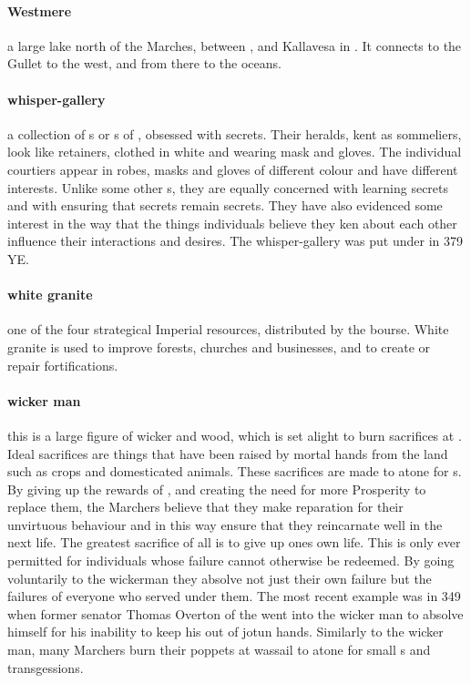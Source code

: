 \paragraph{Westmere} a large lake north of the Marches, between ,  and Kallavesa in . It connects to the Gullet to the west, and from there to the oceans.
\paragraph{whisper-gallery} a collection of s or s of , obsessed with secrets. Their heralds, kent as sommeliers, look like retainers, clothed in white and wearing mask and gloves. The individual courtiers appear in robes, masks and gloves of different colour and have different interests. Unlike some other  s, they are equally concerned with learning secrets and with ensuring that secrets remain secrets. They have also evidenced some interest in the way that the things individuals believe they ken about each other influence their interactions and desires. The whisper-gallery was put under  in 379 YE.
\paragraph{white granite} one of the four strategical Imperial resources, distributed by the bourse. White granite is used to improve forests, churches and businesses, and to create or repair fortifications.
\paragraph{wicker man} this is a large figure of wicker and wood, which is set alight to burn sacrifices at . Ideal sacrifices are things that have been raised by mortal hands from the land such as crops and domesticated animals. These sacrifices are made to atone for s. By giving up the rewards of , and creating the need for more Prosperity to replace them, the Marchers believe that they make reparation for their unvirtuous behaviour and in this way ensure that they reincarnate well in the next life. The greatest sacrifice of all is to give up ones own life. This is only ever permitted for individuals whose failure cannot otherwise be redeemed. By going voluntarily to the wickerman they absolve not just their own failure but the failures of everyone who served under them. The most recent example was in 349 when former senator Thomas Overton of the  went into the wicker man to absolve himself for his inability to keep his  out of jotun hands. Similarly to the wicker man, many Marchers burn their poppets at wassail to atone for small s and transgessions. 
